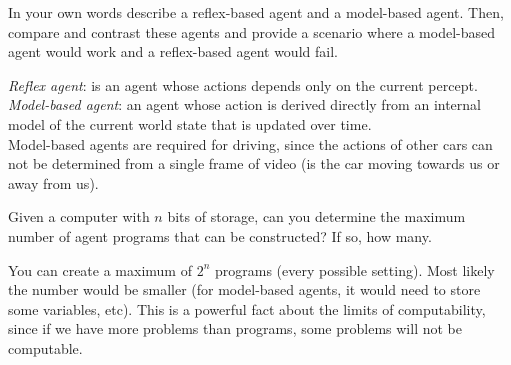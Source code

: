 \documentclass[11pt,letterpaper,addpoints]{exam}
\begin{document}
\begin{questions}

\pagebreak

\question In your own words describe a reflex-based agent and a model-based agent.  Then, compare and
contrast these agents and provide a scenario where a model-based agent would work and 
a reflex-based agent would fail.
\begin{solutionorbox}[1.0 in]
{\it Reflex agent}: is an agent whose actions depends only on the current percept. \\
{\it Model-based agent}: an agent whose action is derived directly from an internal 
model of the current world state that is updated over time. \\
Model-based agents are required for driving, since the actions of other cars can not be determined
from a single frame of video (is the car moving towards us or away from us).  
\end{solutionorbox}

\question Given a computer with $n$ bits of storage, can you determine the maximum number of
agent programs that can be constructed?  If so, how many.  
\begin{solutionorbox}[1.0 in]
You can create a maximum of $2^{n}$ programs (every possible setting).  Most likely the number
would be smaller (for model-based agents, it would need to store some variables, etc).  This
is a powerful fact about the limits of computability, since if we have more problems than programs, 
some problems will not be computable.  
\end{solutionorbox}




\end{questions}
\end{document}
